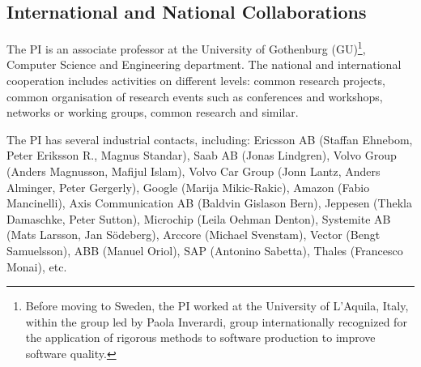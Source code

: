 \documentclass[12pt]{article}
\begin{document}
 

 



\vspace{-.1cm}

\subsection{International and National Collaborations }\label{sec:collaboration}
The PI is an associate professor at the University of Gothenburg (GU)\footnote{Before moving to Sweden, the PI worked at the University of L'Aquila, Italy, within the group led by Paola Inverardi, group internationally recognized for the application of rigorous methods to software production to improve software quality.}, Computer Science and Engineering department. 
The national and international cooperation includes activities on different levels: common research projects, common organisation of research events such as conferences and workshops, networks or working groups, common research and similar. 

The PI has several industrial contacts, including: Ericsson AB (Staffan Ehnebom, Peter Eriksson R., Magnus Standar), Saab AB (Jonas Lindgren), Volvo Group (Anders Magnusson, Mafijul Islam), Volvo Car Group (Jonn Lantz, Anders Alminger, Peter Gergerly), Google (Marija Mikic-Rakic), Amazon (Fabio Mancinelli), Axis Communication AB (Baldvin Gislason Bern), Jeppesen (Thekla Damaschke, Peter Sutton), Microchip (Leila Oehman Denton), Systemite AB (Mats Larsson, Jan S\"odeberg), Arccore (Michael Svenstam), Vector (Bengt Samuelsson), ABB (Manuel Oriol), SAP (Antonino Sabetta), Thales (Francesco Monai), etc. 
\end{document}
